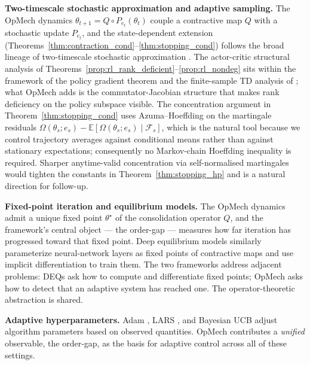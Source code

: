 \documentclass[12pt,a4paper]{article}
\newcommand{\Ogap}{\Omega}
\begin{document}
\textbf{Two-timescale stochastic approximation and adaptive sampling.}
The OpMech dynamics $\theta_{t+1} = Q \circ P_{e_t}(\theta_t)$ couple a
contractive map $Q$ with a stochastic update $P_{e_t}$, and the
state-dependent extension (Theorems~\ref{thm:contraction_cond}--\ref{thm:stopping_cond})
follows the broad lineage of two-timescale stochastic approximation
\citep{borkar1997twotimescale,borkar2008stochastic}. The actor-critic
structural analysis of
Theorems~\ref{prop:rl_rank_deficient}--\ref{prop:rl_nondeg} sits within the
framework of the policy gradient theorem
\citep{sutton2000pg,konda2003actorcritic} and the finite-sample TD analysis
of \citet{tsitsiklis1997td,bhandari2018td}; what OpMech adds is the
commutator-Jacobian structure that makes rank deficiency on the policy
subspace visible. The concentration argument in
Theorem~\ref{thm:stopping_cond} uses Azuma--Hoeffding on the martingale
residuals $\Ogap(\theta_s; e_s) - \mathbb{E}[\Ogap(\theta_s; e_s) \mid
\mathcal{F}_s]$, which is the natural tool because we control trajectory
averages against conditional means rather than against stationary
expectations; consequently no Markov-chain Hoeffding inequality
\citep[as in][]{paulin2015mixingtimes,glynn2002hoeffding} is required.
Sharper anytime-valid concentration via self-normalised martingales
\citep{howard2021timeuniform} would tighten the constants in
Theorem~\ref{thm:stopping_hp} and is a natural direction for follow-up.

\textbf{Fixed-point iteration and equilibrium models.}
The OpMech dynamics admit a unique fixed point $\theta^\star$ of the
consolidation operator $Q$, and the framework's central object — the
order-gap — measures how far iteration has progressed toward that fixed
point. Deep equilibrium models \citep{bai2019deepequilibrium} similarly
parameterize neural-network layers as fixed points of contractive maps and
use implicit differentiation to train them. The two frameworks address
adjacent problems: DEQs ask how to compute and differentiate fixed points;
OpMech asks how to detect that an adaptive system has reached one. The
operator-theoretic abstraction is shared.

\textbf{Adaptive hyperparameters.}
Adam \citep{kingma2015adam}, LARS \citep{you2017lars}, and Bayesian UCB
\citep{kaufmann2012bayesian} adjust algorithm parameters based on observed
quantities. OpMech contributes a \emph{unified} observable, the order-gap, as
the basis for adaptive control across all of these settings.
\end{document}
